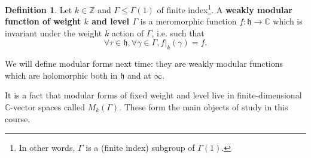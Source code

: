 \documentclass{article}
\theoremstyle{definition}
\newtheorem{defn}{Definition}[section]
\begin{document}
\begin{defn}
    Let $k \in \mathbb{Z}$ and $\Gamma \le \Gamma(1)$ of finite index\footnote{In other words, $\Gamma$ is a (finite index) subgroup of $\Gamma(1)$.}. A \textbf{weakly modular function of weight $k$ and level $\Gamma$} is a meromorphic function $f : \mathfrak{h} \to \mathbb{C}$ which is invariant under the weight $k$ action of $\Gamma$, i.e. such that $$\forall \tau \in \mathfrak{h}, \forall \gamma \in \Gamma, f|_k(\gamma) = f.$$
\end{defn}
We will define modular forms next time: they are weakly modular functions which are holomorphic both in $\mathfrak{h}$ and at $\infty$.
\vspace{1mm}
 
It is a fact that modular forms of fixed weight and level live in finite-dimensional $\mathbb{C}$-vector spaces called $M_k(\Gamma)$. These form the main objects of study in this course.
\vspace{1mm}
 
\end{document}

